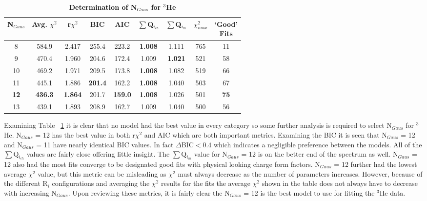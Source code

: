 \vspace{6mm}
\begin{table}[!h]
\centering
\begin{tabular}{|c c c c c c c c c|}
\hline
\textbf{N$_{Gaus}$} & \textbf{Avg. $\chi^2$} & \textbf{r$\chi^2$} & \textbf{BIC} & \textbf{AIC} & \textbf{$\sum$Q$_{i_{ch}}$} & \textbf{$\sum$Q$_{i_{m}}$} & \textbf{$\chi^2_{max}$} & \makecell{\textbf{`Good'}\\ \textbf{Fits}} \\
\hline
8 & 584.9 & 2.417 & 255.4 & 223.2 & \textbf{1.008} & 1.111 & 765 & 11 \\
9 & 470.4 & 1.960 & 204.6 & 172.4 & 1.009 & \textbf{1.021} & 521 & 58 \\
10 & 469.2 & 1.971 & 209.5 & 173.8 & \textbf{1.008} & 1.082 & 519 & 66 \\
11 & 445.1 & 1.886 & \textbf{201.4} & 162.2 & \textbf{1.008} & 1.040 & 503 & 67 \\
\textbf{12} & \textbf{436.3} & \textbf{1.864} & 201.7 & \textbf{159.0} & \textbf{1.008} & 1.026 & 501 & \textbf{75} \\
13 & 439.1 & 1.893 & 208.9 & 162.7 & 1.009 & 1.040 & 500 & 56 \\
\hline
\end{tabular}
\caption{\bf{Determination of N$_{Gaus}$ for $^3$He}}
\label{tab:3he_ngaus}
\end{table}

Examining Table ~\ref{tab:3he_ngaus} it is clear that no model had the best value in every category so some further analysis is required to select N$_{Gaus}$ for $^3$He. N$_{Gaus}$ = 12 has the best value in both r$\chi^2$ and AIC which are both important metrics. Examining the BIC it is seen that N$_{Gaus}$ = 12 and N$_{Gaus}$ = 11 have nearly identical BIC values. In fact $\Delta$BIC$<0.4$ which indicates a negligible preference between the models. All of the $\sum$Q$_{i_{ch}}$ values are fairly close offering little insight. The $\sum$Q$_{i_{m}}$ value for N$_{Gaus}$ = 12 is on the better end of the spectrum as well. N$_{Gaus}$ = 12 also had the most fits converge to be designated good fits with physical looking charge form factors. N$_{Gaus}$ = 12 further had the lowest average $\chi^2$ value, but this metric can be misleading as $\chi^2$ must always decrease as the number of parameters increases. However, because of the different R$_i$ configurations and averaging the $\chi^2$ results for the fits the average $\chi^2$ shown in the table does not always have to decrease with increasing N$_{Gaus}$. Upon reviewing these metrics, it is fairly clear the N$_{Gaus}$ = 12 is the best model to use for fitting the $^3$He data.

